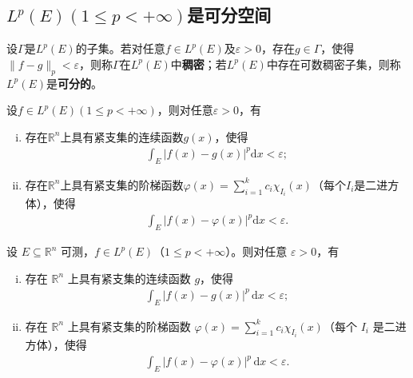\documentclass[../../main.tex]{subfiles}%
\begin{document}
\subsection{$L^p(E)(1\leqslant p<+\infty)$是可分空间}

\begin{definition}
设$\Gamma$是$L^p(E)$的子集。若对任意$f\in L^p(E)$及$\varepsilon>0$，存在$g\in\Gamma$，使得$\|f-g\|_p<\varepsilon$，则称$\Gamma$在$L^p(E)$中\textbf{稠密}；若$L^p(E)$中存在可数稠密子集，则称$L^p(E)$是\textbf{可分的}。
\end{definition}

\begin{lemma}\label{lemma:实变函数--紧支集连续函数逼近Lp}
设$f\in L^p(E)(1\leqslant p<+\infty)$，则对任意$\varepsilon>0$，有
\begin{enumerate}[(i)]
\item 存在$\mathbb{R}^n$上具有紧支集的连续函数$g(x)$，使得
\begin{align*}
\int_E|f(x)-g(x)|^p\mathrm{d}x<\varepsilon;
\end{align*}
\item 存在$\mathbb{R}^n$上具有紧支集的阶梯函数$\varphi(x)=\sum\limits_{i=1}^k c_i\chi_{I_i}(x)$（每个$I_i$是二进方体），使得
\begin{align*}
\int_E|f(x)-\varphi(x)|^p\mathrm{d}x<\varepsilon.
\end{align*}
\end{enumerate}
\end{lemma}
\begin{lemma}\label{lemma:实变函数--紧支集连续函数逼近Lp}
设 \(E\subseteq\mathbb{R}^n\) 可测，\(f\in L^p(E)\)（\(1\leqslant p<+\infty\)）。则对任意 \(\varepsilon>0\)，有
\begin{enumerate}[(i)]
\item 存在 \(\mathbb{R}^n\) 上具有紧支集的连续函数 \(g\)，使得
\begin{align*}
\int_E |f(x)-g(x)|^p\,\mathrm{d}x<\varepsilon;
\end{align*}
\item 存在 \(\mathbb{R}^n\) 上具有紧支集的阶梯函数 \(\varphi(x)=\sum\limits_{i=1}^k c_i\chi_{I_i}(x)\)（每个 \(I_i\) 是二进方体），使得
\begin{align*}
\int_E |f(x)-\varphi(x)|^p\,\mathrm{d}x<\varepsilon.
\end{align*}
\end{enumerate}
\end{lemma}
\end{document}
